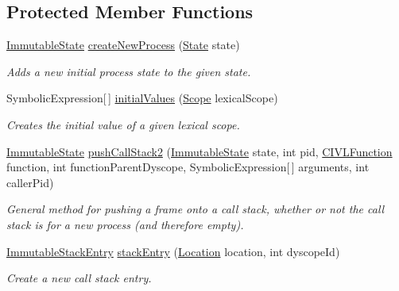 \subsection*{Protected Member Functions}
\begin{DoxyCompactItemize}
\item 
\hyperlink{classedu_1_1udel_1_1cis_1_1vsl_1_1civl_1_1state_1_1common_1_1immutable_1_1ImmutableState}{Immutable\+State} \hyperlink{classedu_1_1udel_1_1cis_1_1vsl_1_1civl_1_1state_1_1common_1_1immutable_1_1ImmutableStateFactory_aab7051f4b53cc88f543f90a95805b9a8}{create\+New\+Process} (\hyperlink{interfaceedu_1_1udel_1_1cis_1_1vsl_1_1civl_1_1state_1_1IF_1_1State}{State} state)
\begin{DoxyCompactList}\small\item\em Adds a new initial process state to the given state. \end{DoxyCompactList}\item 
Symbolic\+Expression\mbox{[}$\,$\mbox{]} \hyperlink{classedu_1_1udel_1_1cis_1_1vsl_1_1civl_1_1state_1_1common_1_1immutable_1_1ImmutableStateFactory_a7f6ae867cb1e6c559f9deeeccfdc77d2}{initial\+Values} (\hyperlink{interfaceedu_1_1udel_1_1cis_1_1vsl_1_1civl_1_1model_1_1IF_1_1Scope}{Scope} lexical\+Scope)
\begin{DoxyCompactList}\small\item\em Creates the initial value of a given lexical scope. \end{DoxyCompactList}\item 
\hyperlink{classedu_1_1udel_1_1cis_1_1vsl_1_1civl_1_1state_1_1common_1_1immutable_1_1ImmutableState}{Immutable\+State} \hyperlink{classedu_1_1udel_1_1cis_1_1vsl_1_1civl_1_1state_1_1common_1_1immutable_1_1ImmutableStateFactory_a680a2342922a0e5db447a9f0fd5857f3}{push\+Call\+Stack2} (\hyperlink{classedu_1_1udel_1_1cis_1_1vsl_1_1civl_1_1state_1_1common_1_1immutable_1_1ImmutableState}{Immutable\+State} state, int pid, \hyperlink{interfaceedu_1_1udel_1_1cis_1_1vsl_1_1civl_1_1model_1_1IF_1_1CIVLFunction}{C\+I\+V\+L\+Function} function, int function\+Parent\+Dyscope, Symbolic\+Expression\mbox{[}$\,$\mbox{]} arguments, int caller\+Pid)
\begin{DoxyCompactList}\small\item\em General method for pushing a frame onto a call stack, whether or not the call stack is for a new process (and therefore empty). \end{DoxyCompactList}\item 
\hyperlink{classedu_1_1udel_1_1cis_1_1vsl_1_1civl_1_1state_1_1common_1_1immutable_1_1ImmutableStackEntry}{Immutable\+Stack\+Entry} \hyperlink{classedu_1_1udel_1_1cis_1_1vsl_1_1civl_1_1state_1_1common_1_1immutable_1_1ImmutableStateFactory_a3756be1f64eb8b339587e93fe4370781}{stack\+Entry} (\hyperlink{interfaceedu_1_1udel_1_1cis_1_1vsl_1_1civl_1_1model_1_1IF_1_1location_1_1Location}{Location} location, int dyscope\+Id)
\begin{DoxyCompactList}\small\item\em Create a new call stack entry. \end{DoxyCompactList}\end{DoxyCompactItemize}

